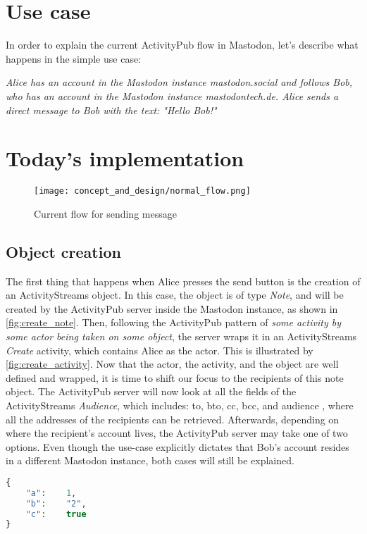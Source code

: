 \section{Use case}
In order to explain the current ActivityPub flow in Mastodon, let's describe what happens in the simple use case:

\emph{Alice has an account in the Mastodon instance mastodon.social and follows Bob, who has an account in the Mastodon instance mastodontech.de. Alice sends a direct message to Bob with the text: "Hello Bob!" }

\section{Today's implementation}

\begin{figure}[h]
  \centering
  \texttt{[image: concept\_and\_design/normal\_flow.png]}
  \caption{Current flow for sending message}
  \label{fig:normal_flow}
\end{figure}

\subsection{Object creation}
The first thing that happens when Alice presses the send button is the creation of an ActivityStreams object. In this case, the object is of type \emph{Note}, and will be created by the ActivityPub server inside the Mastodon instance, as shown in \ref{fig:create_note}. Then, following the ActivityPub pattern of \emph{some activity by some actor being taken on some object}, the server wraps it in an ActivityStreams \emph{Create} activity, which contains Alice as the actor. This is illustrated by \ref{fig:create_activity}. Now that the actor, the activity, and the object are well defined and wrapped, it is time to shift our focus to the recipients of this note object. 
The ActivityPub server will now look at all the fields of the ActivityStreams \emph{Audience}, which includes: to, bto, cc, bcc, and audience \cite{snell_prodromou_2017}, where all the addresses of the recipients can be retrieved. Afterwards, depending on where the recipient's account lives, the ActivityPub server may take one of two options. Even though the use-case explicitly dictates that Bob's account resides in a different Mastodon instance, both cases will still be explained.

\lstset{style=JSONStyle}
\begin{lstlisting}[language=PHP, caption=JSON example]
{
	"a":	1,
	"b":	"2",
	"c":	true
}
\end{lstlisting}

